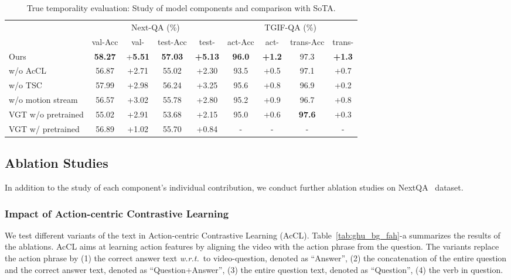 \documentclass[sigconf]{acmart}
\newcommand{\wrt}{\emph{w.r.t.~}}
\begin{document}
\begin{table}[t]
\centering
\scriptsize
\setlength{\tabcolsep}{0.6mm}
\begin{tabular}{l|cccc|cccc}
\hline
  \multirow{2}{*}{} & \multicolumn{4}{c|}{Next-QA (\%)} & \multicolumn{4}{c}{TGIF-QA (\%)} \\
  \cline{2-9}
   & val-Acc  & val- & test-Acc  & test-   &act-Acc &act-   &trans-Acc &trans- \\ \hline
Ours   & \textbf{58.27} &  +\textbf{5.51} & \textbf{57.03} &  \textbf{+5.13} & \textbf{96.0} & \textbf{+1.2} & 97.3 & \textbf{+1.3}    \\  w/o AcCL   & 56.87 & +2.71 & 55.02 & +2.30   & 93.5  & +0.5  & 97.1  &+0.7 \\  
w/o TSC    & 57.99  & +2.98 & 56.24  &+3.25  & 95.6 & +0.8 & 96.9  &+0.2   \\

w/o motion stream   & 56.57 & +3.02  &55.78  &+2.80  & 95.2 & +0.9 & 96.7 & +0.8   \\ 
VGT w/o pretrained & 55.02 & +2.91   &53.68  & +2.15  & 95.0 & +0.6& \textbf{97.6} & +0.3 \\  
VGT w/ pretrained  &56.89  & +1.02  & 55.70 & +0.84  &- &- &- &- \\  \hline
\end{tabular}


\caption{True temporality evaluation: Study of model components and comparison with SoTA.}
\label{tab:re_as}
\end{table} 

\subsection{Ablation Studies}
In addition to the study of each component's individual contribution, we conduct further ablation studies on NextQA~\cite{xiao2021next} dataset. 

\subsubsection{Impact of Action-centric Contrastive Learning}

We test different variants of the text in Action-centric Contrastive Learning (AcCL). Table~\ref{tab:ghu_bg_fah}-a summarizes the results of the ablations. AcCL aims at learning action features by aligning the video with the action phrase from the question. The variants replace the action phrase by (1) the correct answer text \wrt to video-question, denoted as ``Answer'', (2) the concatenation of the entire question and the correct answer text, denoted as ``Question+Answer'', (3) the entire question text, denoted as ``Question'', (4) the verb in question.
\end{document}
